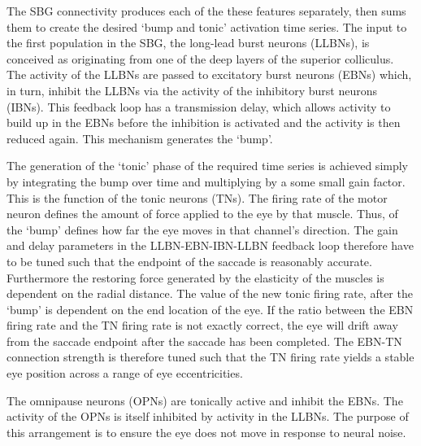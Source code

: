 \documentclass{frontiersSCNS}
\begin{document}
The SBG connectivity produces each of the these features separately,
then sums them to create the desired `bump and tonic' activation time
series.  The input to the first population in the SBG, the long-lead
burst neurons (LLBNs), is conceived as originating from one of the
deep layers of the superior colliculus.  The activity of the LLBNs are
passed to excitatory burst neurons (EBNs) which, in turn, inhibit the
LLBNs via the activity of the inhibitory burst neurons (IBNs).  This
feedback loop has a transmission delay, which allows activity to build
up in the EBNs before the inhibition is activated and the activity is
then reduced again.  This mechanism generates the `bump'.

The generation of the `tonic' phase of the required time series is
achieved simply by integrating the bump over time and multiplying by a
some small gain factor.  This is the function of the tonic neurons
(TNs).  The firing rate of the motor neuron defines the amount of
force applied to the eye by that muscle.  Thus, 
of the `bump'
defines how far the eye moves in that channel's direction.  The gain
and delay parameters in the LLBN-EBN-IBN-LLBN feedback loop therefore
have to be tuned such that the endpoint of the saccade is reasonably
accurate.  Furthermore the restoring force generated by the elasticity
of the muscles is dependent on the radial distance.  The value of the
new tonic firing rate, after the `bump' is dependent on the end
location of the eye.  If the ratio between the EBN firing rate and the
TN firing rate is not exactly correct, the eye will drift away from
the saccade endpoint after the saccade has been completed.  The EBN-TN
connection strength is therefore tuned such that the TN firing rate
yields a stable eye position across a range of eye eccentricities.

The omnipause neurons (OPNs) are tonically active and inhibit the
EBNs.  The activity of the OPNs is itself inhibited by activity in the
LLBNs.  The purpose of this arrangement is to ensure the eye does not
move in response to neural noise.
\end{document}
